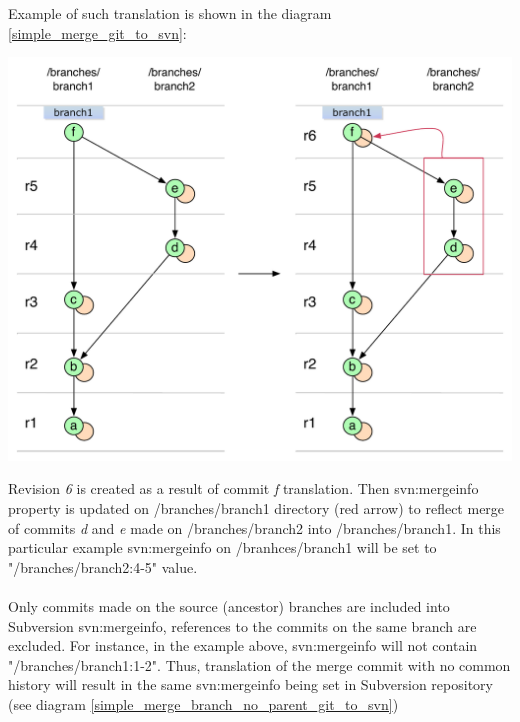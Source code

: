Example of such translation is shown in the diagram \ref{simple_merge_git_to_svn}:

\begin{center}
\includegraphics[width=\textwidth]{img/diagrams/simple_merge_git_to_svn.pdf}%
\label{simple_merge_git_to_svn}%
\end{center}

Revision \emph{6} is created as a result of commit \emph{f} translation. Then svn:mergeinfo property is updated on /branches/branch1 directory
(red arrow) to reflect merge of commits \emph{d} and \emph{e} made on /branches/branch2 into /branches/branch1. In this 
particular example svn:mergeinfo on /branhces/branch1 will be set to "/branches/branch2:4-5" value.
\\\\
Only commits made on the source (ancestor) branches are included into Subversion svn:mergeinfo, references to the commits on the same branch
are excluded. For instance, in the example above, svn:mergeinfo will not contain "/branches/branch1:1-2". Thus, translation of the merge commit with no common history will result in the same svn:mergeinfo being set in Subversion repository (see diagram \ref{simple_merge_branch_no_parent_git_to_svn})

